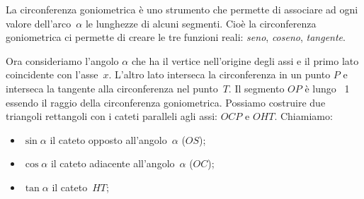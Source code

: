 La circonferenza goniometrica è uno strumento che permette di associare ad 
ogni valore dell'arco~\(\alpha\) le lunghezze di alcuni segmenti. 
Cioè la circonferenza goniometrica ci permette di creare le tre funzioni 
reali: \emph{seno}, \emph{coseno}, \emph{tangente}. 

\noindent\begin{minipage}{.52\textwidth}
Ora consideriamo l'angolo \(\alpha\) che ha il vertice nell'origine degli 
assi e il primo lato coincidente con l'asse~\(x\). L'altro lato interseca la 
circonferenza in un punto \(P\) e interseca la tangente alla circonferenza 
nel punto~\(T\).
Il segmento \(OP\) è lungo ~1 essendo il raggio della circonferenza 
goniometrica.
Possiamo costruire due triangoli rettangoli 
con i cateti paralleli agli assi: \(OCP\) e \(OHT\). 
Chiamiamo:
\begin{itemize} [nosep]
\item \(\sin \alpha\) il cateto opposto all'angolo~\(\alpha\) (\(OS\));
\item \(\cos \alpha\) il cateto adiacente all'angolo~\(\alpha\) (\(OC\));
\item \(\tan \alpha\) il cateto~\(HT\);
\end{itemize}
\end{minipage}
\begin{minipage}{.46\textwidth}
  \begin{center}
\begin{inaccessibleblock}
\scalebox{1.}{\circgonio}
\end{inaccessibleblock}
  \end{center}
\end{minipage}



